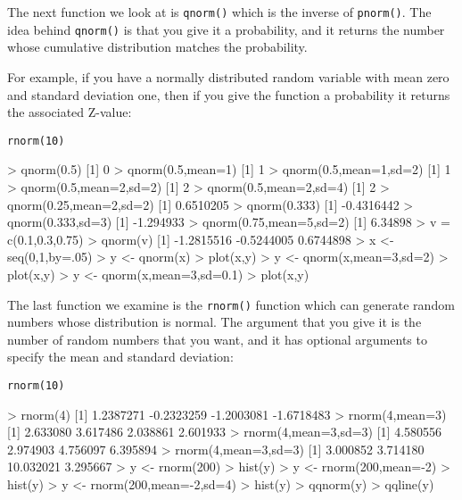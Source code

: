 The next function we look at is \texttt{qnorm()} which is the inverse of \texttt{pnorm()}. The idea behind \texttt{qnorm()} is that you give it a probability, and it returns the number whose cumulative distribution matches the probability.

For example, if you have a normally distributed random variable with mean zero and standard deviation one, then if you give the function a probability it returns the associated Z-value:
\begin{myindentpar}{1cm}
\footnotesize \begin{verbatim}
rnorm(10)
\end{verbatim}\normalsize
\end{myindentpar}
> qnorm(0.5)
[1] 0
> qnorm(0.5,mean=1)
[1] 1
> qnorm(0.5,mean=1,sd=2)
[1] 1
> qnorm(0.5,mean=2,sd=2)
[1] 2
> qnorm(0.5,mean=2,sd=4)
[1] 2
> qnorm(0.25,mean=2,sd=2)
[1] 0.6510205
> qnorm(0.333)
[1] -0.4316442
> qnorm(0.333,sd=3)
[1] -1.294933
> qnorm(0.75,mean=5,sd=2)
[1] 6.34898
> v = c(0.1,0.3,0.75)
> qnorm(v)
[1] -1.2815516 -0.5244005  0.6744898
> x <- seq(0,1,by=.05)
> y <- qnorm(x)
> plot(x,y)
> y <- qnorm(x,mean=3,sd=2)
> plot(x,y)
> y <- qnorm(x,mean=3,sd=0.1)
> plot(x,y)




The last function we examine is the \texttt{rnorm()} function which can generate random numbers whose distribution is normal. The argument that you give it is the number of random numbers that you want, and it has optional arguments to specify the mean and standard deviation:
\begin{myindentpar}{1cm}
\footnotesize \begin{verbatim}
rnorm(10)
\end{verbatim}\normalsize
\end{myindentpar}
> rnorm(4)
[1]  1.2387271 -0.2323259 -1.2003081 -1.6718483
> rnorm(4,mean=3)
[1] 2.633080 3.617486 2.038861 2.601933
> rnorm(4,mean=3,sd=3)
[1] 4.580556 2.974903 4.756097 6.395894
> rnorm(4,mean=3,sd=3)
[1]  3.000852  3.714180 10.032021  3.295667
> y <- rnorm(200)
> hist(y)
> y <- rnorm(200,mean=-2)
> hist(y)
> y <- rnorm(200,mean=-2,sd=4)
> hist(y)
> qqnorm(y)
> qqline(y)

